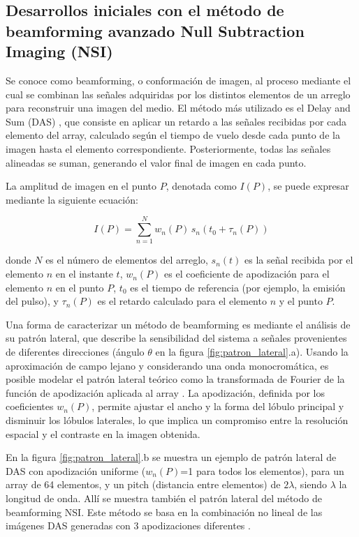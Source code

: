 \documentclass[10pt,a4paper]{article}
\begin{document}
\subsection{Desarrollos iniciales con el método de beamforming avanzado Null Subtraction Imaging (NSI)}\label{sec:nsi}
Se conoce como beamforming, o conformación de imagen, al proceso mediante el cual se combinan las señales adquiridas por los distintos elementos de un arreglo para reconstruir una imagen del medio. El método más utilizado es el Delay and Sum (DAS) \cite{Perrot2021}, que consiste en aplicar un retardo a las señales recibidas por cada elemento del array, calculado según el tiempo de vuelo desde cada punto de la imagen hasta el elemento correspondiente. Posteriormente, todas las señales alineadas se suman, generando el valor final de imagen en cada punto.

La amplitud de imagen en el punto \(P\), denotada como \(I(P)\), se puede expresar mediante la siguiente ecuación:

\begin{equation}\label{eq:das}
	I(P) = \sum_{n=1}^{N} w_n(P) \, s_n \left( t_0 + \tau_n(P) \right)
\end{equation}

donde \(N\) es el número de elementos del arreglo, \(s_n(t)\) es la señal recibida por el elemento \(n\) en el instante \(t\), \(w_n(P)\) es el coeficiente de apodización para el elemento \(n\) en el punto \(P\), \(t_0\) es el tiempo de referencia (por ejemplo, la emisión del pulso), y \(\tau_n(P)\) es el retardo calculado para el elemento \(n\) y el punto \(P\).

Una forma de caracterizar un método de beamforming es mediante el análisis de su patrón lateral, que describe la sensibilidad del sistema a señales provenientes de diferentes direcciones (ángulo $\theta$ en la figura \ref{fig:patron_lateral}.a). Usando la aproximación de campo lejano y considerando una onda monocromática, es posible modelar el patrón lateral teórico como la transformada de Fourier de la función de apodización aplicada al array \cite{Szabo2014}. La apodización, definida por los coeficientes \(w_n(P)\), permite ajustar el ancho y la forma del lóbulo principal y disminuir los lóbulos laterales, lo que implica un compromiso entre la resolución espacial y el contraste en la imagen obtenida.

En la figura \ref{fig:patron_lateral}.b se muestra un ejemplo de patrón lateral de DAS con apodización uniforme (\(w_n(P)\)=1 para todos los elementos), para un array de 64 elementos, y un pitch (distancia entre elementos) de $2\lambda$, siendo $\lambda$ la longitud de onda. Allí se muestra también el patrón lateral del método de beamforming NSI. Este método se basa en la combinación no lineal de las imágenes DAS generadas con 3 apodizaciones diferentes \cite{Agarwal2019_NSI}.
\end{document}
